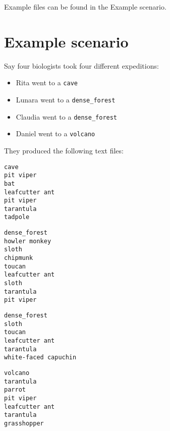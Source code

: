 \documentclass[12pt,letterpaper]{article}
\begin{document}
Example files can be found in the Example scenario.

\section{Example scenario}

Say four biologists took four different expeditions:
\begin{itemize}
    \item Rita went to a \texttt{cave}
    \item Lunara went to a \texttt{dense\_forest}
    \item Claudia went to a \texttt{dense\_forest}
    \item Daniel went to a \texttt{volcano}
\end{itemize}
\vspace{2mm}
They produced the following text files:

\vspace{2mm}
\begin{tcolorbox}[title=cave\_rita.txt]
\begin{lstlisting}[style=textfile]
cave
pit viper
bat
leafcutter ant
pit viper
tarantula
tadpole
\end{lstlisting}
\end{tcolorbox}


\vspace{2mm}
\begin{tcolorbox}[title=dense\_forest\_lunara.txt]
\begin{lstlisting}[style=textfile]
dense_forest
howler monkey
sloth
chipmunk
toucan
leafcutter ant
sloth
tarantula
pit viper
\end{lstlisting}
\end{tcolorbox}

\vspace{2mm}
\begin{tcolorbox}[title=dense\_forest\_claudia.txt]
\begin{lstlisting}[style=textfile]
dense_forest
sloth
toucan
leafcutter ant
tarantula
white-faced capuchin
\end{lstlisting}
\end{tcolorbox}

\vspace{2mm}
\begin{tcolorbox}[title=volcano\_daniel.txt]
\begin{lstlisting}[style=textfile]
volcano
tarantula
parrot
pit viper
leafcutter ant
tarantula
grasshopper
\end{lstlisting}
\end{tcolorbox}
\end{document}
